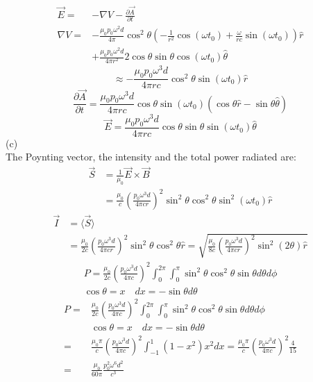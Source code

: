 \documentclass[UTF8]{ctexart}
\begin{document}
	$$\begin{aligned}
	\vec{E}=&-\nabla V-\frac{\partial \vec{A}}{\partial t} \\
	\nabla V=&-\frac{\mu_{0} p_{0} \omega^{2} d}{4 \pi} \cos ^{2} \theta\left(-\frac{1}{r^{2}} \cos \left(\omega t_{0}\right)+\frac{\omega}{r c} \sin \left(\omega t_{0}\right)\right) \hat{r} \\
	&+\frac{\mu_{0} p_{0} \omega^{2} d}{4 \pi r^{2}} 2 \cos \theta \sin \theta \cos \left(\omega t_{0}\right) \hat{\theta}
	\end{aligned}$$
	$$\approx-\frac{\mu_{0} p_{0} \omega^{3} d}{4 \pi r c} \cos ^{2} \theta \sin \left(\omega t_{0}\right) \hat{r}$$
	$$\frac{\partial \vec{A}}{\partial t}=\frac{\mu_{0} p_{0} \omega^{3} d}{4 \pi r c} \cos \theta \sin \left(\omega t_{0}\right)(\cos \theta \hat{r}-\sin \theta \hat{\theta})$$
	$$\vec{E}=\frac{\mu_{0} p_{0} \omega^{3} d}{4 \pi r c} \cos \theta \sin \theta \sin \left(\omega t_{0}\right) \hat{\theta}$$
	(c)\\
	The Poynting vector, the intensity and the total power radiated are:
	$$\begin{aligned}
		\vec{S} &=\frac{1}{\mu_{0}} \vec{E} \times \vec{B} \\
		&=\frac{\mu_{0}}{c}\left(\frac{p_{0} \omega^{3} d}{4 \pi c r}\right)^{2} \sin ^{2} \theta \cos ^{2} \theta \sin ^{2}\left(\omega t_{0}\right) \hat{r}
	\end{aligned}$$
	$$\begin{aligned}
		\vec{I} &=\langle\vec{S}\rangle \\
		&=\frac{\mu_{0}}{2 c}\left(\frac{p_{0} \omega^{3} d}{4 \pi c r}\right)^{2} \sin ^{2} \theta \cos ^{2} \theta \hat{r}=\sqrt{\frac{\mu_{0}}{8 c}\left(\frac{p_{0} \omega^{3} d}{4 \pi c r}\right)^{2} \sin ^{2}(2 \theta) \hat{r}}
	\end{aligned}$$
	$$\begin{array}{c}
	P=\frac{\mu_{0}}{2 c}\left(\frac{p_{0} \omega^{3} d}{4 \pi c}\right)^{2} \int_{0}^{2 \pi} \int_{0}^{\pi} \sin ^{2} \theta \cos ^{2} \theta \sin \theta d \theta d \phi \\
	\cos \theta=x \quad d x=-\sin \theta d \theta
	\end{array}$$
	$$\begin{aligned}
	P=& \frac{\mu_{0}}{2 c}\left(\frac{p_{0} \omega^{3} d}{4 \pi c}\right)^{2} \int_{0}^{2 \pi} \int_{0}^{\pi} \sin ^{2} \theta \cos ^{2} \theta \sin \theta d \theta d \phi \\
	& \cos \theta=x \quad d x=-\sin \theta d \theta \\
	=& \frac{\mu_{0} \pi}{c}\left(\frac{p_{0} \omega^{3} d}{4 \pi c}\right)^{2} \int_{-1}^{1}\left(1-x^{2}\right) x^{2} d x=\frac{\mu_{0} \pi}{c}\left(\frac{p_{0} \omega^{3} d}{4 \pi c}\right)^{2} \frac{4}{15} \\
	=& \frac{\mu_{0}}{60 \pi} \frac{p_{0}^{2} \omega^{6} d^{2}}{c^{3}}
	\end{aligned}$$
\end{document}

